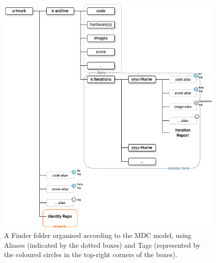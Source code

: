 \begin{figure}[!h]
    \centering
    \includegraphics[width=\linewidth]{chapters/4-MDC_model_application/image/graph04-finder.png}
    \caption{A Finder folder organised according to the MDC model, using Aliases (indicated by the dotted boxes) and Tags (represented by the coloured circles in the top-right corners of the boxes).}
    \label{fig:c4-finder}
\end{figure}

